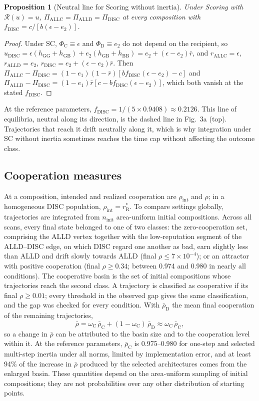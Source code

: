 \documentclass[fleqn,10pt]{article}
\theoremstyle{plain}
\newtheorem{proposition}{Proposition}
\theoremstyle{remark}
\newcommand{\FigStrategy}{3}
\newcommand{\Rm}{\mathcal R}
\newcommand{\G}{\mathrm G}
\newcommand{\B}{\mathrm B}
\newcommand{\C}{\mathrm C}
\newcommand{\D}{\mathrm D}
\newcommand{\ALLC}{\mathrm{ALLC}}
\newcommand{\ALLD}{\mathrm{ALLD}}
\newcommand{\DISC}{\mathrm{DISC}}
\begin{document}
\begin{proposition}[Neutral line for Scoring without inertia]\label{prop:sc-line}
Under Scoring with $\Rm(u)=u$, $\Pi_{\ALLC}=\Pi_{\ALLD}=\Pi_{\DISC}$ at every
composition with $f_{\DISC}=c/[b(\epsilon-e_2)]$.
\end{proposition}
\begin{proof}
Under SC, $\Phi_\C\equiv\epsilon$ and $\Phi_\D\equiv e_2$ do not depend on the
recipient, so $u_{\DISC}=\epsilon(h_{\G\G}+h_{\G\B})+e_2(h_{\G\B}+h_{\B\B})=e_2+(\epsilon-e_2)\bar r$,
and $r_{\ALLC}=\epsilon$, $r_{\ALLD}=e_2$, $r_{\DISC}=e_2+(\epsilon-e_2)\bar r$. Then
$\Pi_{\ALLC}-\Pi_{\DISC}=(1-e_1)(1-\bar r)[b f_{\DISC}(\epsilon-e_2)-c]$ and
$\Pi_{\ALLD}-\Pi_{\DISC}=(1-e_1)\bar r[c-bf_{\DISC}(\epsilon-e_2)]$, which both
vanish at the stated $f_{\DISC}$.
\end{proof}
At the reference parameters, $f_{\DISC}=1/(5\times0.9408)\approx0.2126$. This line
of equilibria, neutral along its direction, is the dashed line in
Fig.~\FigStrategy a (top). Trajectories that reach it drift neutrally along it,
which is why integration under SC without inertia sometimes reaches the time
cap without affecting the outcome class.

\subsection{Cooperation measures}
At a composition, intended and realized cooperation are $\rho_{\mathrm{int}}$ and
$\rho$; in a homogeneous DISC population, $\rho_{\mathrm{int}}=r^*_{\mathrm R}$. To
compare settings globally, trajectories are integrated from $n_{\mathrm{init}}$
area-uniform initial compositions. Across all scans, every final state belonged
to one of two classes: the zero-cooperation set, comprising the ALLD vertex
together with the low-reputation segment of the ALLD--DISC edge, on which DISC
regard one another as bad, earn slightly less than ALLD and drift slowly
towards ALLD (final $\rho\le7\times10^{-4}$); or an attractor with positive
cooperation (final $\rho\ge0.34$; between 0.974 and 0.980 in nearly all
conditions). The cooperative basin is the set of initial compositions whose
trajectories reach the second class. A trajectory is classified as cooperative
if its final $\rho\ge0.01$; every threshold in the observed gap gives the same
classification, and the gap was checked for every condition. With
$\bar\rho_{\D}$ the mean final cooperation of the remaining trajectories,
\begin{equation}
\bar\rho=\omega_\C\,\bar\rho_\C+(1-\omega_\C)\,\bar\rho_{\D}\approx\omega_\C\,\bar\rho_\C ,
\label{eq:S-basin}
\end{equation}
so a change in $\bar\rho$ can be attributed to the basin size and to the
cooperation level within it. At the reference parameters, $\bar\rho_\C$ is
0.975--0.980 for one-step and selected multi-step inertia under all norms,
limited by implementation error, and at least 94\% of the increase in $\bar\rho$
produced by the selected architectures comes from the enlarged basin. These
quantities depend on the area-uniform sampling of initial compositions; they
are not probabilities over any other distribution of starting points.
\end{document}
